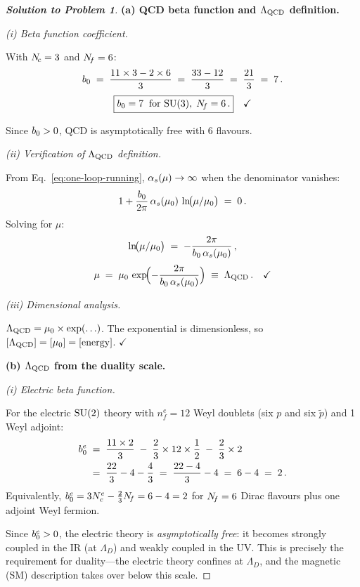 \documentclass[11pt,a4paper]{article}
\begin{document}
\begin{proof}[\textbf{Solution to Problem 1}]

\textbf{(a) QCD beta function and $\Lambda_{\mathrm{QCD}}$ definition.}

\textit{(i) Beta function coefficient.}

With $N_{\!c} = 3$ and $N_{\!f} = 6$:
\[
  b_0 \;=\; \frac{11 \times 3 - 2 \times 6}{3}
  \;=\; \frac{33 - 12}{3}
  \;=\; \frac{21}{3}
  \;=\; 7\,.
\]
\[
  \boxed{b_0 = 7\;\;\text{for } \mathrm{SU}(3),\; N_{\!f} = 6\,.}
  \quad\checkmark
\]

Since $b_0 > 0$, QCD is asymptotically free with 6 flavours.

\textit{(ii) Verification of $\Lambda_{\mathrm{QCD}}$ definition.}

From Eq.~\eqref{eq:one-loop-running}, $\alpha_s(\mu) \to \infty$
when the denominator vanishes:
\[
  1 + \frac{b_0}{2\pi}\, \alpha_s(\mu_0)\,
  \ln\!\bigl(\mu/\mu_0\bigr) \;=\; 0\,.
\]
Solving for $\mu$:
\[
  \ln\!\bigl(\mu/\mu_0\bigr)
  \;=\; -\frac{2\pi}{b_0\, \alpha_s(\mu_0)}\,,
\]
\[
  \mu \;=\; \mu_0\, \exp\!\Bigl(
    -\frac{2\pi}{b_0\, \alpha_s(\mu_0)}
  \Bigr)
  \;\equiv\; \Lambda_{\mathrm{QCD}}\,.
  \quad\checkmark
\]

\textit{(iii) Dimensional analysis.}

$\Lambda_{\mathrm{QCD}} = \mu_0 \times \exp(\ldots)$.  The exponential is
dimensionless, so
$[\Lambda_{\mathrm{QCD}}] = [\mu_0] = [\text{energy}]$.
\quad$\checkmark$

\bigskip

\textbf{(b) $\Lambda_{\mathrm{QCD}}$ from the duality scale.}

\textit{(i) Electric beta function.}

For the electric $\mathrm{SU}(2)$ theory with $n_f^e = 12$ Weyl doublets
(six $p$ and six $\widetilde{p}$) and 1 Weyl adjoint:
\begin{align}
  b_0^e
  &\;=\; \frac{11 \times 2}{3}
  \;-\; \frac{2}{3} \times 12 \times \frac{1}{2}
  \;-\; \frac{2}{3} \times 2
  \nonumber \\
  &\;=\; \frac{22}{3} - 4 - \frac{4}{3}
  \;=\; \frac{22 - 4}{3} - 4
  \;=\; 6 - 4 \;=\; 2\,.
\end{align}
Equivalently, $b_0^e = 3N_c^e - \tfrac{2}{3}N_{\!f} = 6 - 4 = 2$ for
$N_{\!f} = 6$ Dirac flavours plus one adjoint Weyl fermion.

Since $b_0^e > 0$, the electric theory is \emph{asymptotically
free}: it becomes strongly coupled in the IR (at $\Lambda_D$) and
weakly coupled in the UV.  This is precisely the requirement for
duality---the electric theory confines at $\Lambda_D$, and the
magnetic (SM) description takes over below this scale.


\end{proof}
\end{document}
